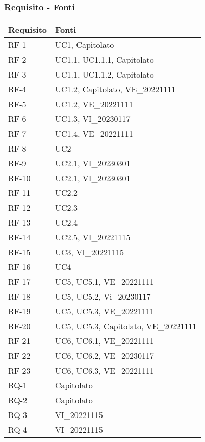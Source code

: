 \subsubsection{Requisito - Fonti}
\begin{center}
	\setlength\extrarowheight{5pt}
	\begin{xltabular}{\textwidth}{|X|X|}
		\hline
		\textbf{Requisito} & \textbf{Fonti} \\
		\hline
		RF-1 & UC1, Capitolato\\
		\hline
		RF-2 & UC1.1, UC1.1.1, Capitolato\\
		\hline
		RF-3 & UC1.1, UC1.1.2, Capitolato\\
		\hline
		RF-4 & UC1.2, Capitolato, VE\_20221111\\
		\hline
		RF-5 & UC1.2, VE\_20221111\\
		\hline
		RF-6 & UC1.3, VI\_20230117\\
		\hline
		RF-7 & UC1.4, VE\_20221111\\
		\hline
		RF-8 & UC2\\
		\hline
		RF-9 & UC2.1, VI\_20230301\\
		\hline
		RF-10 & UC2.1, VI\_20230301\\
		\hline
		RF-11 & UC2.2\\
		\hline
		RF-12 & UC2.3\\
		\hline
		RF-13 & UC2.4\\
		\hline
		RF-14 & UC2.5, VI\_20221115\\
		\hline
		RF-15 & UC3, VI\_20221115\\
		\hline
		RF-16 & UC4\\
		\hline
		RF-17 & UC5, UC5.1, VE\_20221111\\
		\hline
		RF-18 & UC5, UC5.2, Vi\_20230117\\
		\hline
		RF-19 & UC5, UC5.3, VE\_20221111\\
		\hline
		RF-20 & UC5, UC5.3, Capitolato, VE\_20221111\\
		\hline
		RF-21 & UC6, UC6.1, VE\_20221111\\
		\hline
		RF-22 & UC6, UC6.2, VE\_20230117\\
		\hline
		RF-23 & UC6, UC6.3, VE\_20221111\\
		\hline
		RQ-1 & Capitolato\\
		\hline
		RQ-2 & Capitolato\\
		\hline
		RQ-3 & VI\_20221115\\
		\hline
		RQ-4 & VI\_20221115\\

\end{xltabular}
\end{center}
